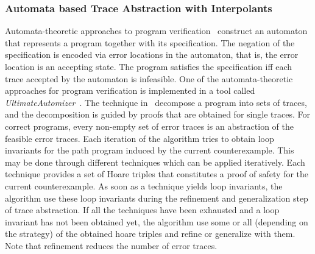 \subsubsection{Automata based Trace Abstraction with Interpolants}
%
Automata-theoretic approaches to program verification~\cite{DBLP:conf/cav/KupfermanV00,
DBLP:books/sp/cstoday95/Vardi95,DBLP:conf/cav/HeizmannHP13} construct 
an automaton that represents a program together with its specification.
The negation of the specification is encoded via error locations in the automaton, 
that is, the error location is an accepting state.  The program satisfies the 
specification iff each trace accepted by the automaton is infeasible.
%
One of the automata-theoretic approaches for program verification 
is implemented in a tool called 
\textit{UltimateAutomizer}~\cite{DBLP:conf/tacas/HeizmannDGLMSP16}. 
The technique in~\cite{DBLP:conf/tacas/HeizmannDGLMSP16} decompose a 
program into sets of traces, and the decomposition is guided by proofs that 
are obtained for single traces. For correct programs, every non-empty set 
of error traces is an abstraction of the feasible error traces.  
Each iteration of the algorithm tries to obtain loop invariants for the path program
induced by the current counterexample.  This may be done through different techniques 
which can be applied iteratively. Each technique provides a set of Hoare triples that constitutes a proof of
safety for the current counterexample.
As soon as a technique yields loop invariants, the algorithm use these loop
invariants during the refinement and generalization step of trace abstraction.  If all the 
techniques have been exhausted and a loop invariant has not been obtained yet, the algorithm
use some or all (depending on the strategy) of the obtained hoare triples and 
refine or generalize with them.  Note that refinement reduces the number of error traces. 
